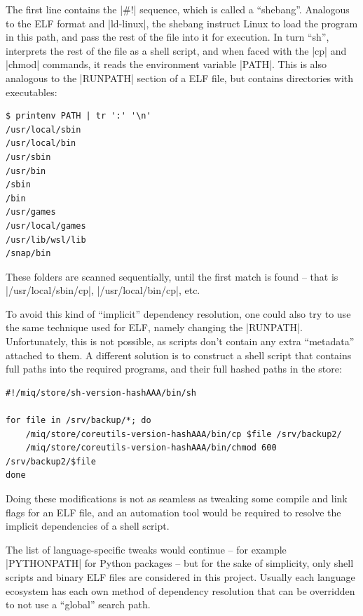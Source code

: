 The first line contains the |#!| sequence, which is called a
``shebang''. Analogous to the ELF format and |ld-linux|, the
shebang instruct Linux to load the program in this path, and
pass the rest of the file into it for execution. In turn
``sh'', interprets the rest of the file as a shell script,
and when faced with the |cp| and |chmod| commands, it reads
the environment variable |PATH|. This is also analogous to
the |RUNPATH| section of a ELF file, but contains
directories with executables:

\begin{verbatim}
$ printenv PATH | tr ':' '\n'
/usr/local/sbin
/usr/local/bin
/usr/sbin
/usr/bin
/sbin
/bin
/usr/games
/usr/local/games
/usr/lib/wsl/lib
/snap/bin
\end{verbatim}

These folders are scanned sequentially, until the first
match is found -- that is |/usr/local/sbin/cp|, |/usr/local/bin/cp|, etc.

To avoid this kind of ``implicit'' dependency resolution,
one could also try to use the same technique used for ELF,
namely changing the |RUNPATH|. Unfortunately, this is not
possible, as scripts don't contain any extra ``metadata''
attached to them. A different solution is to construct a
shell script that contains full paths into the required
programs, and their full hashed paths in the store:

\begin{verbatim}
#!/miq/store/sh-version-hashAAA/bin/sh

for file in /srv/backup/*; do
    /miq/store/coreutils-version-hashAAA/bin/cp $file /srv/backup2/
    /miq/store/coreutils-version-hashAAA/bin/chmod 600 /srv/backup2/$file
done
\end{verbatim}

Doing these modifications is not as seamless as tweaking some
compile and link flags for an ELF file, and an automation
tool would be required to resolve the implicit dependencies
of a shell script.

The list of language-specific tweaks would continue -- for
example |PYTHONPATH| for Python packages -- but for the sake
of simplicity, only shell scripts and binary ELF files are
considered in this project. Usually each language ecosystem
has each own method of dependency resolution that can be
overridden to not use a ``global'' search path.
